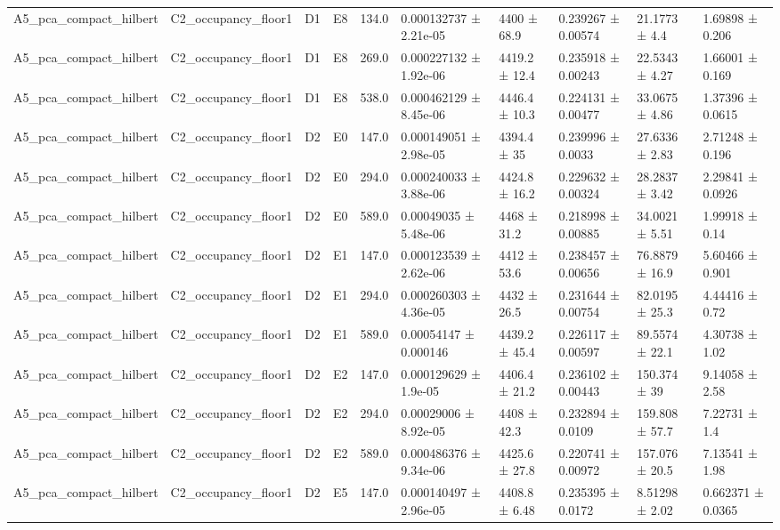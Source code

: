 \begin{table}
\begin{tabular}{llllllllll}
A5\_pca\_compact\_hilbert & C2\_occupancy\_floor1 & D1 & E8 & 134.0 & 0.000132737 ± 2.21e-05 & 4400 ± 68.9 & 0.239267 ± 0.00574 & 21.1773 ± 4.4 & 1.69898 ± 0.206 \\
A5\_pca\_compact\_hilbert & C2\_occupancy\_floor1 & D1 & E8 & 269.0 & 0.000227132 ± 1.92e-06 & 4419.2 ± 12.4 & 0.235918 ± 0.00243 & 22.5343 ± 4.27 & 1.66001 ± 0.169 \\
A5\_pca\_compact\_hilbert & C2\_occupancy\_floor1 & D1 & E8 & 538.0 & 0.000462129 ± 8.45e-06 & 4446.4 ± 10.3 & 0.224131 ± 0.00477 & 33.0675 ± 4.86 & 1.37396 ± 0.0615 \\
A5\_pca\_compact\_hilbert & C2\_occupancy\_floor1 & D2 & E0 & 147.0 & 0.000149051 ± 2.98e-05 & 4394.4 ± 35 & 0.239996 ± 0.0033 & 27.6336 ± 2.83 & 2.71248 ± 0.196 \\
A5\_pca\_compact\_hilbert & C2\_occupancy\_floor1 & D2 & E0 & 294.0 & 0.000240033 ± 3.88e-06 & 4424.8 ± 16.2 & 0.229632 ± 0.00324 & 28.2837 ± 3.42 & 2.29841 ± 0.0926 \\
A5\_pca\_compact\_hilbert & C2\_occupancy\_floor1 & D2 & E0 & 589.0 & 0.00049035 ± 5.48e-06 & 4468 ± 31.2 & 0.218998 ± 0.00885 & 34.0021 ± 5.51 & 1.99918 ± 0.14 \\
A5\_pca\_compact\_hilbert & C2\_occupancy\_floor1 & D2 & E1 & 147.0 & 0.000123539 ± 2.62e-06 & 4412 ± 53.6 & 0.238457 ± 0.00656 & 76.8879 ± 16.9 & 5.60466 ± 0.901 \\
A5\_pca\_compact\_hilbert & C2\_occupancy\_floor1 & D2 & E1 & 294.0 & 0.000260303 ± 4.36e-05 & 4432 ± 26.5 & 0.231644 ± 0.00754 & 82.0195 ± 25.3 & 4.44416 ± 0.72 \\
A5\_pca\_compact\_hilbert & C2\_occupancy\_floor1 & D2 & E1 & 589.0 & 0.00054147 ± 0.000146 & 4439.2 ± 45.4 & 0.226117 ± 0.00597 & 89.5574 ± 22.1 & 4.30738 ± 1.02 \\
A5\_pca\_compact\_hilbert & C2\_occupancy\_floor1 & D2 & E2 & 147.0 & 0.000129629 ± 1.9e-05 & 4406.4 ± 21.2 & 0.236102 ± 0.00443 & 150.374 ± 39 & 9.14058 ± 2.58 \\
A5\_pca\_compact\_hilbert & C2\_occupancy\_floor1 & D2 & E2 & 294.0 & 0.00029006 ± 8.92e-05 & 4408 ± 42.3 & 0.232894 ± 0.0109 & 159.808 ± 57.7 & 7.22731 ± 1.4 \\
A5\_pca\_compact\_hilbert & C2\_occupancy\_floor1 & D2 & E2 & 589.0 & 0.000486376 ± 9.34e-06 & 4425.6 ± 27.8 & 0.220741 ± 0.00972 & 157.076 ± 20.5 & 7.13541 ± 1.98 \\
A5\_pca\_compact\_hilbert & C2\_occupancy\_floor1 & D2 & E5 & 147.0 & 0.000140497 ± 2.96e-05 & 4408.8 ± 6.48 & 0.235395 ± 0.0172 & 8.51298 ± 2.02 & 0.662371 ± 0.0365 \\

\end{tabular}
\end{table}
